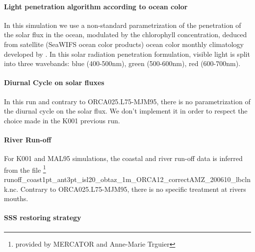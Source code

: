 \documentclass[12pt]{article}
\begin{document}
\paragraph{Light penetration algorithm according to ocean color \\}

In this simulation we use a non-standard parametrization of the penetration of the solar flux in the ocean, modulated by the chlorophyll concentration, deduced from satellite (SeaWIFS ocean color products) ocean color monthly climatology developed by \cite{Lengaigne2007}. In this solar radiation penetration formulation, visible light is split into three wavebands: blue (400-500nm), green (500-600nm), red (600-700nm).

\scriptsize


\normalsize

\paragraph{Diurnal Cycle on solar fluxes \\}

In this run and contrary to ORCA025.L75-MJM95, there is no parametrization of the diurnal cycle on the solar flux. We don't implement it in order to respect the choice made in the K001 previous run.

\paragraph{River Run-off \\}

For K001 and MAL95 simulations, the coastal and river run-off data is inferred from the file \footnote{provided by MERCATOR and Anne-Marie Trguier} runoff\_coast1pt\_ant3pt\_isl20\_obtaz\_1m\_ORCA12\_correctAMZ\_200610\_lbclnk.nc. Contrary to ORCA025.L75-MJM95, there is no specific treatment at rivers mouths.

\scriptsize


\normalsize

\paragraph{SSS restoring strategy \\}
\end{document}
